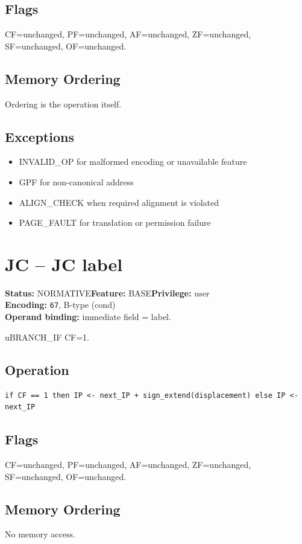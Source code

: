 \documentclass[10pt]{article}
\begin{document}
\subsection*{Flags}
CF=unchanged, PF=unchanged, AF=unchanged, ZF=unchanged, SF=unchanged, OF=unchanged.
\subsection*{Memory Ordering}
Ordering is the operation itself.
\subsection*{Exceptions}
\begin{itemize}
\item INVALID\_OP for malformed encoding or unavailable feature
\item GPF for non-canonical address
\item ALIGN\_CHECK when required alignment is violated
\item PAGE\_FAULT for translation or permission failure
\end{itemize}
\clearpage

\section{JC -- JC label}
\textbf{Status:} NORMATIVE\quad \textbf{Feature:} BASE\quad \textbf{Privilege:} user\\
\textbf{Encoding:} \texttt{67}, B-type (cond)\\
\textbf{Operand binding:} immediate field = label.

uBRANCH\_IF CF=1.

\subsection*{Operation}
\begin{lstlisting}
if CF == 1 then IP <- next_IP + sign_extend(displacement) else IP <- next_IP
\end{lstlisting}
\subsection*{Flags}
CF=unchanged, PF=unchanged, AF=unchanged, ZF=unchanged, SF=unchanged, OF=unchanged.
\subsection*{Memory Ordering}
No memory access.
\end{document}
